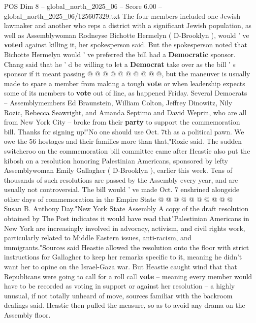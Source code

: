 \begin{textsample}{POS Dim 8 – global\_north\_2025\_06 – Score 6.00 – global\_north\_2025\_06/125607329.txt}
The four members included one Jewish lawmaker and another who reps a district with a significant Jewish population, as well as Assemblywoman Rodneyse Bichotte Hermelyn ( D-Brooklyn ), would ' ve \textbf{voted} against killing it, her spokesperson said.
But the spokesperson noted that Bichotte Hermelyn would ' ve preferred the bill had a \textbf{Democratic} sponsor.
Chang said that he ' d be willing to let a \textbf{Democrat} take over as the bill ' s sponsor if it meant passing @ @ @ @ @ @ @ @ @ @, but the maneuver is usually made to spare a member from making a tough \textbf{vote} or when leadership expects some of its members to \textbf{vote} out of line, as happened Friday.
Several Democrats -- Assemblymembers Ed Braunstein, William Colton, Jeffrey Dinowitz, Nily Rozic, Rebecca Seawright, and Amanda Septimo and David Weprin, who are all from New York City -- broke from their \textbf{party} to support the commemoration bill.
Thanks for signing up!"No one should use Oct. 7th as a political pawn.
We owe the 56 hostages and their families more than that,"Rozic said.
The sudden switcheroo on the commemoration bill committee came after Heastie also put the kibosh on a resolution honoring Palestinian Americans, sponsored by lefty Assemblywoman Emily Gallagher ( D-Brooklyn ), earlier this week.
Tens of thousands of such resolutions are passed by the Assembly every year, and are usually not controversial.
The bill would ' ve made Oct. 7 enshrined alongside other days of commemoration in the Empire State @ @ @ @ @ @ @ @ @ @ Susan B.
Anthony Day."New York State Assembly A copy of the draft resolution obtained by The Post indicates it would have read that"Palestinian Americans in New York are increasingly involved in advocacy, activism, and civil rights work, particularly related to Middle Eastern issues, anti-racism, and immigrants."Sources said Heastie allowed the resolution onto the floor with strict instructions for Gallagher to keep her remarks specific to it, meaning he didn't want her to opine on the Israel-Gaza war.
But Heastie caught wind that that Republicans were going to call for a roll call \textbf{vote} -- meaning every member would have to be recorded as voting in support or against her resolution -- a highly unusual, if not totally unheard of move, sources familiar with the backroom dealings said.
Heastie then pulled the measure, so as to avoid any drama on the Assembly floor.

\end{textsample}
